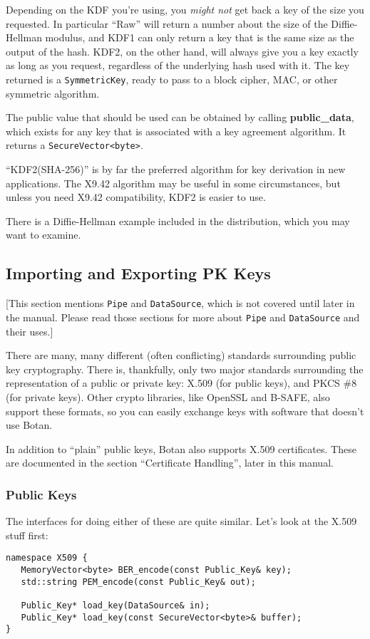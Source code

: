 \documentclass{article}
\newcommand{\function}[1]{\textbf{#1}}
\newcommand{\type}[1]{\texttt{#1}}
\begin{document}
Depending on the KDF you're using, you \emph{might not} get back a key
of the size you requested. In particular ``Raw'' will return a number
about the size of the Diffie-Hellman modulus, and KDF1 can only return
a key that is the same size as the output of the hash. KDF2, on the
other hand, will always give you a key exactly as long as you request,
regardless of the underlying hash used with it. The key returned is a
\type{SymmetricKey}, ready to pass to a block cipher, MAC, or other
symmetric algorithm.

The public value that should be used can be obtained by calling
\function{public\_data}, which exists for any key that is associated with a
key agreement algorithm. It returns a \type{SecureVector<byte>}.

``KDF2(SHA-256)'' is by far the preferred algorithm for key derivation
in new applications. The X9.42 algorithm may be useful in some
circumstances, but unless you need X9.42 compatibility, KDF2 is easier
to use.

There is a Diffie-Hellman example included in the distribution, which you may
want to examine.

\subsection{Importing and Exporting PK Keys}

[This section mentions \type{Pipe} and \type{DataSource}, which is not covered
until later in the manual. Please read those sections for more about
\type{Pipe} and \type{DataSource} and their uses.]

There are many, many different (often conflicting) standards surrounding public
key cryptography. There is, thankfully, only two major standards surrounding
the representation of a public or private key: X.509 (for public keys), and
PKCS \#8 (for private keys). Other crypto libraries, like OpenSSL and B-SAFE,
also support these formats, so you can easily exchange keys with software that
doesn't use Botan.

In addition to ``plain'' public keys, Botan also supports X.509 certificates.
These are documented in the section ``Certificate Handling'', later in this
manual.

\subsubsection{Public Keys}

The interfaces for doing either of these are quite similar. Let's look at the
X.509 stuff first:
\begin{verbatim}
namespace X509 {
   MemoryVector<byte> BER_encode(const Public_Key& key);
   std::string PEM_encode(const Public_Key& out);

   Public_Key* load_key(DataSource& in);
   Public_Key* load_key(const SecureVector<byte>& buffer);
}
\end{verbatim}
\end{document}

